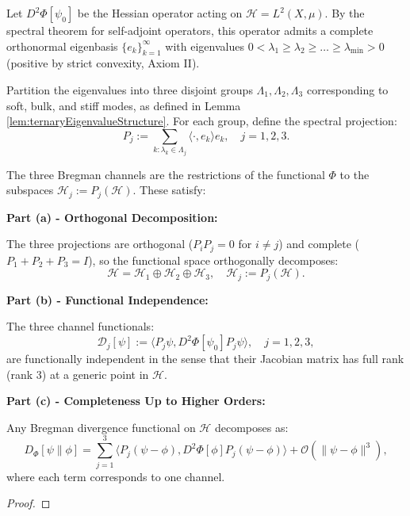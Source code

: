 \begin{definition}
\begin{lemma}
Let $D^2\Phi[\psi_0]$ be the Hessian operator acting on $\mathcal{H} = L^2(X, \mu)$. By the spectral theorem for self-adjoint operators, this operator admits a complete orthonormal eigenbasis $\{e_k\}_{k=1}^\infty$ with eigenvalues $0 < \lambda_1 \geq \lambda_2 \geq \ldots \geq \lambda_{\min} > 0$ (positive by strict convexity, Axiom II).

Partition the eigenvalues into three disjoint groups $\Lambda_1, \Lambda_2, \Lambda_3$ corresponding to soft, bulk, and stiff modes, as defined in Lemma \ref{lem:ternaryEigenvalueStructure}. For each group, define the spectral projection:
\begin{equation}
P_j := \sum_{k: \lambda_k \in \Lambda_j} \langle \cdot, e_k \rangle e_k, \quad j = 1, 2, 3.
\end{equation}

The three Bregman channels are the restrictions of the functional $\Phi$ to the subspaces $\mathcal{H}_j := P_j(\mathcal{H})$. These satisfy:

\textbf{Part (a) - Orthogonal Decomposition:}

The three projections are orthogonal ($P_i P_j = 0$ for $i \neq j$) and complete ($P_1 + P_2 + P_3 = I$), so the functional space orthogonally decomposes:
\begin{equation}
\mathcal{H} = \mathcal{H}_1 \oplus \mathcal{H}_2 \oplus \mathcal{H}_3, \quad \mathcal{H}_j := P_j(\mathcal{H}).
\end{equation}

\textbf{Part (b) - Functional Independence:}

The three channel functionals:
\begin{equation}
\mathcal{D}_j[\psi] := \langle P_j \psi, D^2\Phi[\psi_0] P_j \psi \rangle, \quad j = 1, 2, 3,
\end{equation}
are functionally independent in the sense that their Jacobian matrix has full rank (rank 3) at a generic point in $\mathcal{H}$.

\textbf{Part (c) - Completeness Up to Higher Orders:}

Any Bregman divergence functional on $\mathcal{H}$ decomposes as:
\begin{equation}
D_{\Phi}[\psi \| \phi] = \sum_{j=1}^3 \langle P_j(\psi - \phi), D^2\Phi[\phi] P_j(\psi - \phi) \rangle + \mathcal{O}(\|\psi - \phi\|^3),
\end{equation}
where each term corresponds to one channel.

\begin{proof}


\end{proof}
\end{lemma}
\end{definition}
